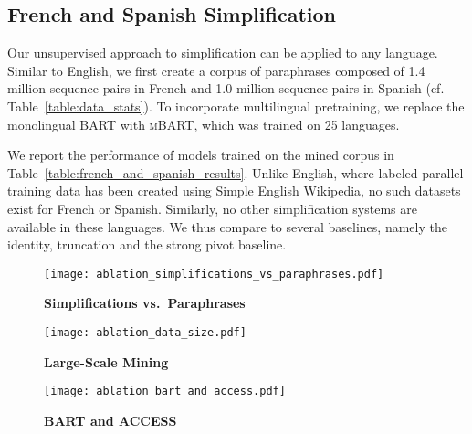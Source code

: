 \documentclass[11pt]{article}
\newcommand{\asset}{ASSET\xspace}
\newcommand{\muss}{\textsc{MUSS}\xspace}
\newcommand{\bart}{\textsc{BART}\xspace}
\newcommand{\mbart}{\textsc{mBART}\xspace}
\newcommand{\access}{\mbox{\textsc{ACCESS}}\xspace}
\begin{document}
\subsection{French and Spanish Simplification}

Our unsupervised approach to simplification can be applied to any language.
Similar to English, we first create a corpus of paraphrases composed of 1.4 million sequence pairs in French and 1.0 million sequence pairs in Spanish (cf. Table~\ref{table:data_stats}).
To incorporate multilingual pretraining, we replace the monolingual \bart with  \mbart, which was trained on 25 languages.

We report the performance of models trained on the mined corpus in Table~\ref{table:french_and_spanish_results}. Unlike English, where labeled parallel training data has been created using Simple English Wikipedia, no such datasets exist for French or Spanish. Similarly, no other simplification systems are available in these languages. We thus compare to several baselines, namely the identity, truncation and the strong pivot baseline.


\begin{figure*}[!htbp]
    \centering
\begin{subfigure}{0.30\textwidth}
    \centering
    \texttt{[image: ablation\_simplifications\_vs\_paraphrases.pdf]}
    \caption{\label{subfigure:ablation_simplifications_vs_paraphrases} \textbf{Simplifications vs.~\mbox{Paraphrases}}}
\end{subfigure}
\hspace{1em}
\begin{subfigure}{0.30\textwidth}
    \centering
    \texttt{[image: ablation\_data\_size.pdf]}
    \caption{\label{subfigure:ablation_data_size} \textbf{Large-Scale Mining}}
\end{subfigure}
\hspace{1em}
\begin{subfigure}{0.30\textwidth}
    \centering
    \texttt{[image: ablation\_bart\_and\_access.pdf]}
    \caption{\label{subfigure:ablation_bart_and_access}\textbf{\bart and \access}}
\end{subfigure}
\caption{\textbf{Ablations} We display averaged SARI scores on the English \asset test set with 95\% confidence intervals (5 runs). () Models trained on mined simplifications or mined paraphrases, () \muss trained on varying amounts of mined data, () Models trained with or without \bart and/or \access.}
\end{figure*}
\end{document}
